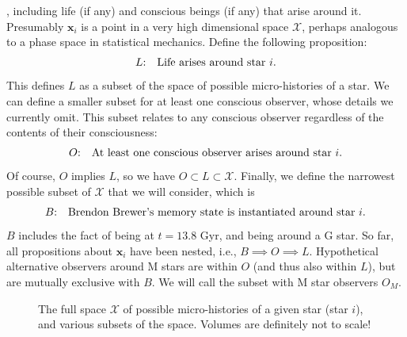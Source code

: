 \documentclass[a4paper, 12pt]{article}
\begin{document}
, including life (if any) and conscious beings (if any)
that arise around it. Presumably $\boldsymbol{x}_i$ is a point in a very high
dimensional space $\mathcal{X}$, perhaps analogous to a phase space in
statistical mechanics.
Define the following proposition:
\begin{align}
L\textnormal{:}\quad\textnormal{Life arises around star}~i. 
\end{align}
This defines $L$ as a subset of the space of possible micro-histories of a star.
We can define a smaller subset for at least one conscious observer,
whose details we currently omit. This subset relates to any conscious observer
regardless of the contents of their consciousness:
\begin{align}
O\textnormal{:}
\quad\textnormal{At least one conscious observer arises around star}~i. 
\end{align}
Of course, $O$ implies $L$, so we have $O \subset L \subset \mathcal{X}$.
Finally, we define the narrowest possible subset of $\mathcal{X}$ that we
will consider, which is
\begin{align}
B\textnormal{:}
\quad\textnormal{Brendon Brewer's memory state is instantiated around star}~i. 
\end{align}
$B$ includes the fact of being at $t=13.8$ Gyr, and being around a G star.
So far, all propositions about $\boldsymbol{x}_i$ have been nested, i.e.,
$B \implies O \implies L$.
Hypothetical alternative observers around M stars are within $O$ (and thus
also within $L$), but are mutually exclusive with $B$. We will call the
subset with M star observers $O_M$.

\begin{figure}
\centering
{}
\caption{The full space $\mathcal{X}$ of possible micro-histories of a given
star (star $i$), and various subsets of the space. Volumes are definitely
not to scale!\label{fig:sets}}
\end{figure}
\end{document}
